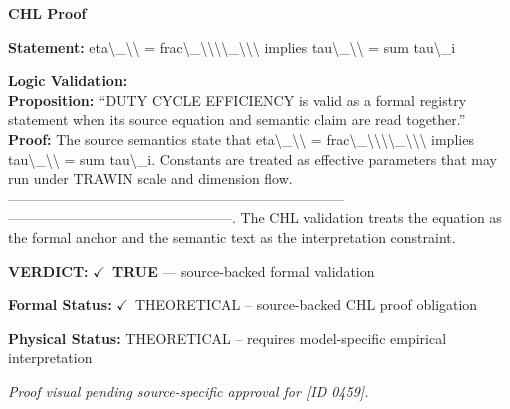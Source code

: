 \vspace{0.45em}
\noindent\textbf{CHL Proof}\par
\textbf{Statement:} eta\textbackslash{}\_\textbackslash{}\textbackslash{} = frac\textbackslash{}\_\textbackslash{}\textbackslash{}\textbackslash{}\textbackslash{}\_\textbackslash{}\textbackslash{}\textbackslash{} implies tau\textbackslash{}\_\textbackslash{}\textbackslash{} = sum tau\textbackslash{}\_i

\textbf{Logic Validation:}\\
\textbf{Proposition:} ``DUTY CYCLE EFFICIENCY is valid as a formal registry statement when its source equation
and semantic claim are read together.''\\
\textbf{Proof:} The source semantics state that eta\textbackslash{}\_\textbackslash{}\textbackslash{} = frac\textbackslash{}\_\textbackslash{}\textbackslash{}\textbackslash{}\textbackslash{}\_\textbackslash{}\textbackslash{}\textbackslash{} implies tau\textbackslash{}\_\textbackslash{}\textbackslash{} = sum tau\textbackslash{}\_i.
Constants are treated as effective parameters that may run under TRAWIN scale and
dimension flow. ------------------------------------------------------------------------
------------------------------------------------. The CHL validation treats the equation
as the formal anchor and the semantic text as the interpretation constraint.

\textbf{VERDICT:} \ensuremath{\checkmark}\ \textbf{TRUE} --- source-backed formal validation

\textbf{Formal Status:} \ensuremath{\checkmark}\ THEORETICAL -- source-backed CHL proof obligation

\textbf{Physical Status:} THEORETICAL -- requires model-specific empirical interpretation
\par\vspace{0.45em}
\par
\vfill
\begingroup\footnotesize\itshape
Proof visual pending source-specific approval for [ID 0459].
\par\endgroup
\vfill
\endgroup
\endgroup
